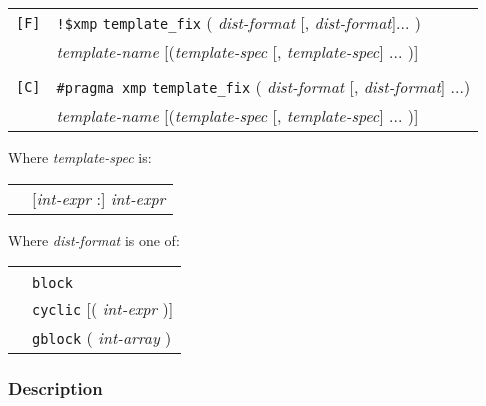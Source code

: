 \begin{tabular}{ll}
\verb![F]! & \verb|!$xmp| {\tt template\_fix} ( {\it dist-format} [,
 {\it dist-format}]... )\\
 & {\it template-name} [({\it template-spec} [, {\it template-spec}] ... )] \\
& \\
\verb![C]! & \verb|#pragma xmp|  {\tt template\_fix} ( {\it dist-format}
     [, {\it dist-format}] ...)\\
 & {\it template-name} [({\it template-spec} [, {\it template-spec}] ... )] \\
\end{tabular}
\vspace{0.3cm}

Where {\it template-spec} is:

\begin{tabular}{ll}
 \hspace{0.5cm} & [{\it int-expr} :] {\it int-expr} \\
\end{tabular}
\vspace{0.3cm}

Where {\it dist-format} is one of:

\begin{tabular}{ll}
 \hspace{0.5cm} & {\tt *} \\
 & {\tt block} \\
 & {\tt cyclic} [( {\it int-expr} )] \\
 & {\tt gblock} ( {\it int-array} ) \\
\end{tabular}

\subsubsection*{Description}

